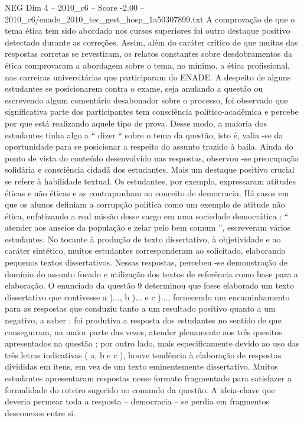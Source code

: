 \begin{textsample}{NEG Dim 4 – 2010\_c6 – Score -2.00 – 2010\_c6/enade\_2010\_tec\_gest\_hosp\_1a50307899.txt}
A comprovação de que o tema ética tem sido abordado nos cursos superiores foi outro destaque positivo detectado durante as correções.
Assim, além do caráter crítico de que muitas das respostas corretas se revestiram, os relatos constantes sobre desdobramentos da ética comprovaram a abordagem sobre o tema, no mínimo, a ética profissional, nas carreiras universitárias que participaram do ENADE.
A despeito de alguns estudantes se posicionarem contra o exame, seja anulando a questão ou escrevendo algum comentário desabonador sobre o processo, foi observado que significativa parte dos participantes tem consciência político-acadêmica e percebe por que está realizando aquele tipo de prova.
Desse modo, a maioria dos estudantes tinha algo a “ dizer “ sobre o tema da questão, isto é, valia -se da oportunidade para se posicionar a respeito do assunto trazido à baila.
Ainda do ponto de vista do conteúdo desenvolvido nas respostas, observou -se preocupação solidária e consciência cidadã dos estudantes.
Mais um destaque positivo crucial se refere à habilidade textual.
Os estudantes, por exemplo, expressaram atitudes éticas e não éticas e as contrapunham ao conceito de democracia.
Há casos em que os alunos definiam a corrupção política como um exemplo de atitude não ética, enfatizando a real missão desse cargo em uma sociedade democrática : “ atender aos anseios da população e zelar pelo bem comum ”, escreveram vários estudantes.
No tocante à produção de texto dissertativo, à objetividade e ao caráter sintético, muitos estudantes corresponderam ao solicitado, elaborando pequenos textos dissertativos.
Nessas respostas, percebeu -se demonstração de domínio do assunto focado e utilização dos textos de referência como base para a elaboração.
O enunciado da questão 9 determinou que fosse elaborado um texto dissertativo que contivesse a )..., b )... e c )..., fornecendo um encaminhamento para as respostas que conduziu tanto a um resultado positivo quanto a um negativo, a saber : foi produtiva a resposta dos estudantes no sentido de que conseguiram, na maior parte das vezes, atender plenamente aos três quesitos apresentados na questão ; por outro lado, mais especificamente devido ao uso das três letras indicativas ( a, b e c ), houve tendência à elaboração de respostas divididas em itens, em vez de um texto eminentemente dissertativo.
Muitos estudantes apresentaram respostas nesse formato fragmentado para satisfazer a formalidade do roteiro sugerido no comando da questão.
A ideia-chave que deveria permear toda a resposta – democracia – se perdia em fragmentos desconexos entre si.

\end{textsample}
